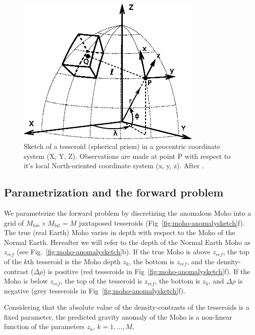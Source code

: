 \begin{figure}
    \centering
    \includegraphics[width=0.8\textwidth]{figures/paper-moho/tesseroid-coord-sys}
    \caption{Sketch of a tesseroid (spherical prism) in a geocentric coordinate
        system (X, Y, Z).
        Observations are made at point P with respect to it's local
        North-oriented coordinate system (x, y, z).
        After \citet{uieda2015}.
    }
    \label{fig:moho-tesseroid}
\end{figure}


\subsection{Parametrization and the forward problem}

We parameterize the forward problem by discretizing the anomalous Moho
into a grid of $M_{lon} \times M_{lat} = M$ juxtaposed tesseroids
(Fig~\ref{fig:moho-anomalysketch}f).
The true (real Earth) Moho varies in depth
with respect to the Moho of the Normal Earth.
Hereafter we will refer to the depth of the Normal Earth Moho as $z_{ref}$
(see Fig.~\ref{fig:moho-anomalysketch}b).
If the true Moho is above $z_{ref}$,
the top of the $k$th tesseroid is the Moho depth $z_{k}$,
the bottom is $z_{ref}$, and the density-contrast ($\Delta\rho$) is positive
(red tesseroids in Fig~\ref{fig:moho-anomalysketch}f).
If the Moho is below $z_{ref}$, the top of the tesseroid is $z_{ref}$,
the bottom is $z_k$, and $\Delta\rho$ is negative
(grey tesseroids in Fig~\ref{fig:moho-anomalysketch}f).

Considering that the absolute value of the density-contrasts
of the tesseroids is a fixed parameter,
the predicted gravity anomaly of the Moho is a non-linear function of the
parameters $z_k$, $k=1, \ldots, M$,

